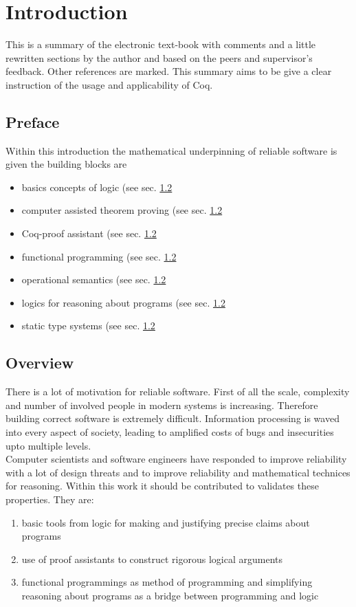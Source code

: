 \section{Introduction}

This is a summary of the electronic text-book \cite{PACGGHSY} with comments and a little rewritten sections by the author and based on the peers and supervisor's feedback. 
Other references are marked. 
This summary aims to be give a clear instruction of the usage and applicability of Coq.\\

\subsection{Preface}

Within this introduction the mathematical underpinning of reliable software is given the building blocks are
\begin{itemize}
\item basics concepts of logic (see sec. \ref{} %
\item computer assisted theorem proving (see sec. \ref{} %
\item Coq-proof assistant (see sec. \ref{} %
\item functional programming (see sec. \ref{} %
\item operational semantics (see sec. \ref{} %
\item logics for reasoning about programs (see sec. \ref{} %
\item static type systems (see sec. \ref{} %
\end{itemize} 


\subsection{Overview}

There is a lot of motivation for reliable software. 
First of all the scale, complexity and number of involved people in modern systems is increasing.
Therefore building correct software is extremely difficult.
Information processing is waved into every aspect of society, leading to amplified costs of bugs and insecurities upto multiple levels.\\
Computer scientists and software engineers have responded to improve reliability with a lot of design threats and to improve reliability and mathematical technices for reasoning.
Within this work it should be contributed to validates these properties. They are:
\begin{enumerate}
\item basic tools from logic for making and justifying precise claims about programs
\item use of proof assistants to construct rigorous logical arguments
\item functional programmings as method of programming and simplifying reasoning about programs as a bridge between programming and logic
\end{enumerate}



